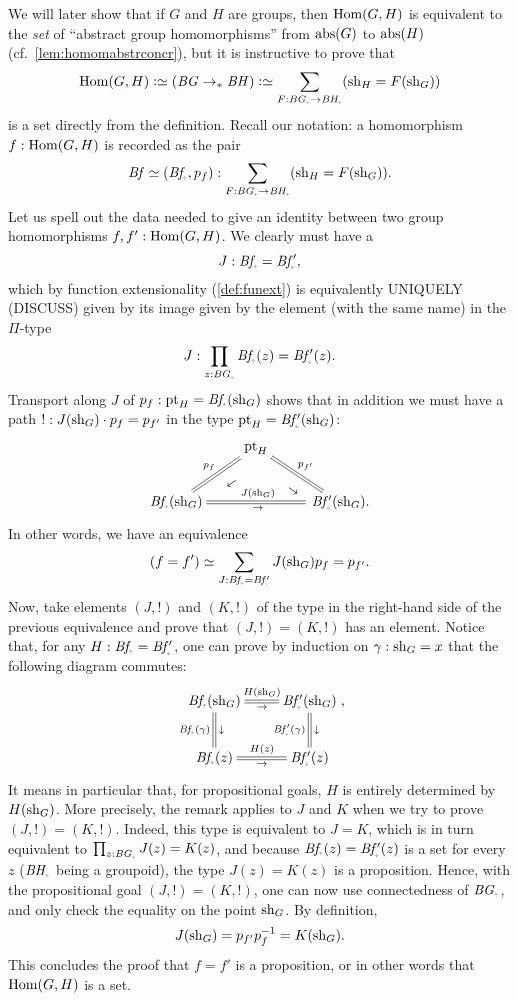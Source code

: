 \begin{example}
  We will later show that if $G$ and $H$ are groups, then $\Hom(G,H)$
  is equivalent to the \emph{set} of ``abstract group homomorphisms''
  from $\mathrm{abs}(G)$ to $\mathrm{abs}(H)$ (cf.\ \cref{lem:homomabstrconcr}),
  but it is instructive to prove that
  \[
    \Hom(G,H) \defequi (\BG\ptdto\BH) \defequi
    \sum_{F:\BG_\div\to \BH_\div}(\sh_H=F(\sh_G))
  \]
  is a set directly from the definition. Recall our notation: a
  homomorphism $f:\Hom(G,H)$ is recorded as the pair
  \begin{displaymath}
    \Bf \jdeq (\Bf_\div,p_f):\sum_{F:\BG_\div\to \BH_\div}(\sh_H=F(\sh_G)).
  \end{displaymath}
  Let us spell out the data needed to give an identity between two
  group homomorphisms $f,f':\Hom(G,H)$.  We clearly must have a
  $$J:\Bf_\div=\Bf_\div',$$
  which by function extensionality (\cref{def:funext}) is equivalently
  UNIQUELY (DISCUSS) given by its image given by the element (with the same
  name) in the $\Pi$-type
  $$J:\prod_{z:\BG_\div}\Bf_\div(z)=\Bf'_\div(z).$$ 
  Transport along $J$ of $p_f:\pt_H=\Bf_\div(\sh_G)$ shows that in
  addition we must have a path $!:J(\mathrm{sh}_G)\cdot p_f=p_{f'}$ in the
  type ${\pt_H=\Bf'_\div(\sh_G)}$:
  \begin{displaymath}
    \xymatrix{&\pt_H\ar@{=}[dl]_{p_f}^{\rotatebox{35}{\footnotesize$\gets$}}
      \ar@{=}[dr]^{p_{f'}}_{\rotatebox{-35}{\footnotesize$\to$}}&\\
      \Bf_\div(\sh_G)\ar@{=}[rr]^{J(\sh_G)}_\to&&\,\Bf'_\div(\sh_G).}
  \end{displaymath}
  In other words, we have an equivalence
  $$(f=f')\simeq \sum_{J:\Bf_\div=\Bf'_\div}J(\sh_G)p_f=p_{f'}.$$
  Now, take elements $(J,!)$ and $(K,!)$ of the type in the right-hand
  side of the previous equivalence and prove that $(J,!) = (K,!)$ has
  an element. Notice that, for any $H:\Bf_\div = \Bf'_\div$, one can
  prove by induction on $\gamma:\mathrm{sh}_G=x$ that the following diagram
  commutes:
  $$\xymatrix{
    \Bf_\div(\sh_G)\ar@{=}[r]^{H(\sh_G)}_\to\ar@{=}[d]^\downarrow_{\Bf_\div(\gamma)}&
    \Bf'_\div(\sh_G)\ar@{=}[d]^\downarrow_{\Bf'_\div(\gamma)}\\
    \Bf_\div(z)\ar@{=}[r]^{H(z)}_\to&\Bf'_\div(z)},
  $$
  It means in particular that, for propositional goals, $H$ is
  entirely determined by $H(\mathrm{sh}_G)$. More precisely, the remark
  applies to $J$ and $K$ when we try to prove $(J,!) = (K,!)$. Indeed,
  this type is equivalent to $J=K$, which is in turn equivalent to
  $\prod_{z:\BG_\div}J(z)=K(z)$, and because $\Bf_\div(z)=\Bf'_\div(z)$
  is a set for every $z$ ($\BH_\div$ being a groupoid), the type
  $J(z)=K(z)$ is a proposition. Hence, with the propositional goal
  $(J,!) = (K,!)$, one can now use connectedness of $\BG_\div$, and
  only check the equality on the point $\mathrm{sh}_G$. By definition,
  \begin{displaymath}
    J(\mathrm{sh}_G) = p_{f'}p_f^{-1} = K(\mathrm{sh}_G).
  \end{displaymath}
  This concludes the proof that $f=f'$ is a proposition, or in other
  words that $\Hom(G,H)$ is a set.


\end{example}
